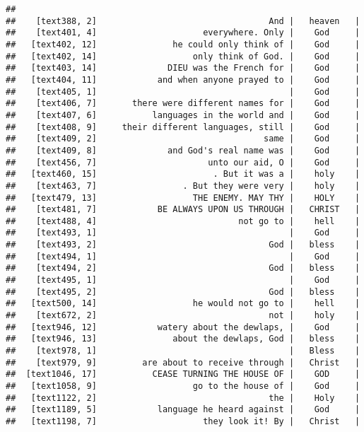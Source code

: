 \documentclass[]{article}
\begin{document}
\begin{verbatim}
##                                                                    
##    [text388, 2]                                  And |   heaven   |
##    [text401, 4]                     everywhere. Only |    God     |
##   [text402, 12]               he could only think of |    God     |
##   [text402, 14]                   only think of God. |    God     |
##   [text403, 14]              DIEU was the French for |    God     |
##   [text404, 11]            and when anyone prayed to |    God     |
##    [text405, 1]                                      |    God     |
##    [text406, 7]       there were different names for |    God     |
##    [text407, 6]           languages in the world and |    God     |
##    [text408, 9]     their different languages, still |    God     |
##    [text409, 2]                                 same |    God     |
##    [text409, 8]              and God's real name was |    God     |
##    [text456, 7]                      unto our aid, O |    God     |
##   [text460, 15]                       . But it was a |    holy    |
##    [text463, 7]                 . But they were very |    holy    |
##   [text479, 13]                   THE ENEMY. MAY THY |    HOLY    |
##    [text481, 7]            BE ALWAYS UPON US THROUGH |   CHRIST   |
##    [text488, 4]                            not go to |    hell    |
##    [text493, 1]                                      |    God     |
##    [text493, 2]                                  God |   bless    |
##    [text494, 1]                                      |    God     |
##    [text494, 2]                                  God |   bless    |
##    [text495, 1]                                      |    God     |
##    [text495, 2]                                  God |   bless    |
##   [text500, 14]                   he would not go to |    hell    |
##    [text672, 2]                                  not |    holy    |
##   [text946, 12]            watery about the dewlaps, |    God     |
##   [text946, 13]               about the dewlaps, God |   bless    |
##    [text978, 1]                                      |   Bless    |
##    [text979, 9]         are about to receive through |   Christ   |
##  [text1046, 17]           CEASE TURNING THE HOUSE OF |    GOD     |
##   [text1058, 9]                   go to the house of |    God     |
##   [text1122, 2]                                  the |    Holy    |
##   [text1189, 5]            language he heard against |    God     |
##   [text1198, 7]                     they look it! By |   Christ   |

\end{verbatim}
\end{document}
